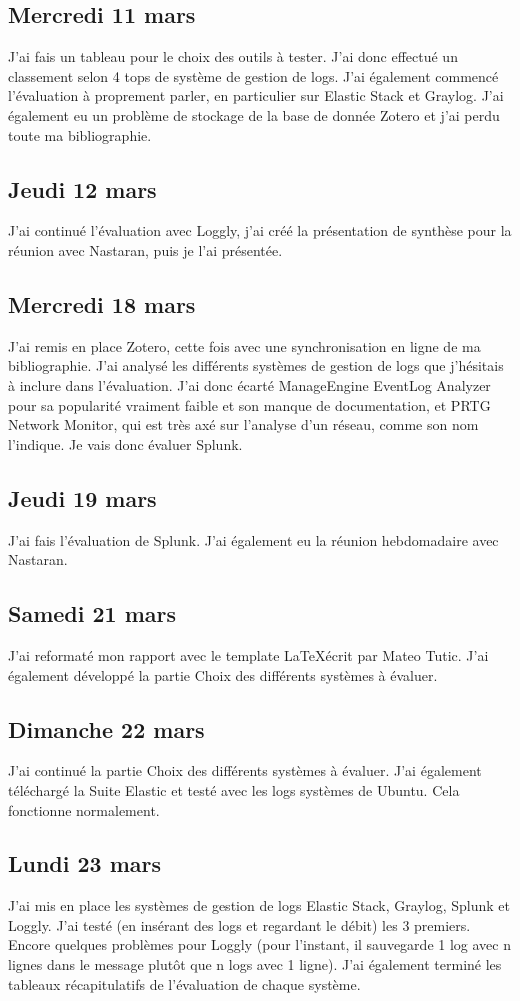 \documentclass[paper=a4, fontsize=11pt]{scrartcl}
\begin{document}
\subsection{Mercredi 11 mars}
    J'ai fais un tableau pour le choix des outils à tester. J'ai donc effectué un classement selon 4 tops de système de gestion de logs.
    J'ai également commencé l'évaluation à proprement parler, en particulier sur Elastic Stack et Graylog. J'ai également eu un problème de stockage de la base de donnée Zotero et j'ai perdu toute ma bibliographie.
\subsection{Jeudi 12 mars}
    J'ai continué l'évaluation avec Loggly, j'ai créé la présentation de synthèse pour la réunion avec Nastaran, puis je l'ai présentée.
\subsection{Mercredi 18 mars}
    J'ai remis en place Zotero, cette fois avec une synchronisation en ligne de ma bibliographie. J'ai analysé les différents systèmes de gestion de logs que j'hésitais à inclure dans l'évaluation. J'ai donc écarté ManageEngine EventLog Analyzer pour sa popularité vraiment faible et son manque de documentation, et PRTG Network Monitor, qui est très axé sur l'analyse d'un réseau, comme son nom l'indique. Je vais donc évaluer Splunk.
\subsection{Jeudi 19 mars}
    J'ai fais l'évaluation de Splunk. J'ai également eu la réunion hebdomadaire avec Nastaran.
\subsection{Samedi 21 mars}
    J'ai reformaté mon rapport avec le template \LaTeX écrit par Mateo Tutic. J'ai également développé la partie Choix des différents systèmes à évaluer.
\subsection{Dimanche 22 mars}
    J'ai continué la partie Choix des différents systèmes à évaluer. J'ai également téléchargé la Suite Elastic et testé avec les logs systèmes de Ubuntu. Cela fonctionne normalement.
\subsection{Lundi 23 mars}
    J'ai mis en place les systèmes de gestion de logs Elastic Stack, Graylog, Splunk et Loggly. J'ai testé (en insérant des logs et regardant le débit) les 3 premiers. Encore quelques problèmes pour Loggly (pour l'instant, il sauvegarde 1 log avec n lignes dans le message plutôt que n logs avec 1 ligne). J'ai également terminé les tableaux récapitulatifs de l'évaluation de chaque système.
\end{document}
